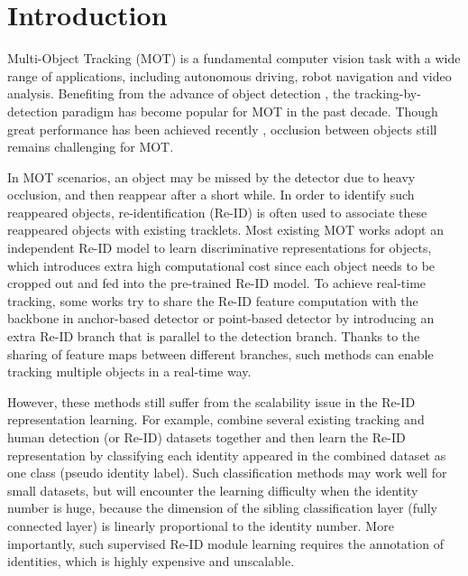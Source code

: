 \documentclass[final,1p,times,twocolumn]{elsarticle}
\begin{document}
	\section{Introduction}	
	\label{sec:introduction}
	Multi-Object Tracking (MOT) is a fundamental computer vision task with a wide range of applications, including autonomous driving, robot navigation and video analysis. Benefiting from the advance of object detection \cite{felzenszwalb2009object, ren2016faster, law2018cornernet, zhou2019objects}, the tracking-by-detection paradigm has become popular for MOT in the past decade. Though great performance has been achieved recently \cite{zhang2020fairmot, zhou2020tracking, stadler2021improving,zheng2021improving,shuai2021siammot}, occlusion between objects still remains challenging for MOT.
	
	In MOT scenarios, an object may be missed by the detector due to heavy occlusion, and then reappear after a short while. In order to identify such reappeared objects, re-identification (Re-ID) is often used to associate these reappeared objects with existing tracklets. Most existing MOT works
	\cite{wojke2017simple, liugsm, bergmann2019tracking, liu2021multi}
	adopt an independent Re-ID model to learn discriminative representations for objects, which introduces extra high computational cost since each object needs to be cropped out and fed into the pre-trained Re-ID model. To achieve real-time tracking, some works try to share the Re-ID feature computation with the backbone in anchor-based detector \cite{liu2019real, wang2019towards} or point-based detector \cite{zhang2020fairmot} by introducing an extra Re-ID branch that is parallel to the detection branch. Thanks to the sharing of feature maps between different branches, such methods can enable tracking multiple objects in a real-time way. 

	However, these methods
	\cite{zhu2018online, wojke2017simple, wang2019towards, zhang2020fairmot} still suffer from the scalability issue in the Re-ID representation learning. For example, \cite{zhu2018online, wang2019towards, zhang2020fairmot} combine several existing tracking and human detection (or Re-ID) datasets together and then learn the Re-ID representation by classifying each identity appeared in the combined dataset as one class (pseudo identity label). Such classification methods may work well for small datasets,
	but will encounter the learning difficulty when the identity number is huge, because the dimension of the sibling classification layer (fully connected layer) is linearly proportional to the identity number. More importantly, such supervised Re-ID module learning requires the annotation of identities, which is highly expensive and unscalable. 
	
\end{document}
